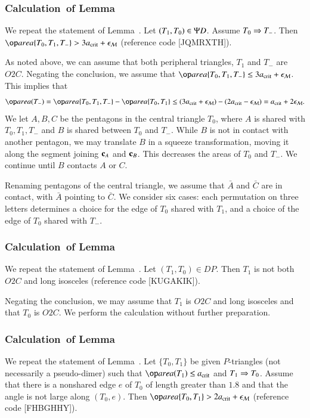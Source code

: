 \subsubsection{Calculation~of Lemma~}\label{sec:pseudo-area3}

We repeat the statement of Lemma~.  Let
$(T_1,T_0)\in\Psi D$. Assume $T_0\Rightarrow T_-$.  Then $\area\{T_0,T_1,T_-\} >
3\acrit + \epsM$ (reference code [JQMRXTH]).

As noted above, we can assume that both peripheral triangles, $T_1$
and $T_-$ are $O2C$.  Negating the conclusion, we assume that
$\area\{T_0,T_1,T_-\}\le 3\acrit+\epsM$.  This implies that
\[
\area(T_-) = \area\{T_0,T_1,T_-\} - \area\{T_0,T_1\} 
\le (3\acrit+\epsM) - (2\acrit - \epsM) = \acrit + 2\epsM.
\]
We let $A,B,C$ be the pentagons in the central triangle $T_0$, where
$A$ is shared with $T_0,T_1,T_-$ and $B$ is shared between $T_0$ and
$T_-$.  While $B$ is not in contact with another pentagon, we may
translate $B$ in a squeeze transformation, moving it along the segment
joining ${\mathbf c}_A$ and ${\mathbf c}_B$.  This decreases the areas of $T_0$ and
$T_-$.  We continue until $B$ contacts $A$ or $C$.

Renaming pentagons of the central triangle, we assume that $\bar A$
and $\bar C$ are in contact, with $\bar A$ pointing to $\bar C$.  We
consider six cases: each permutation on three letters determines a
choice for the edge of $T_0$ shared with $T_1$, and a choice of the
edge of $T_0$ shared with $T_-$.

\subsubsection{Calculation~of Lemma~}\label{sec:dimer-isosc}

We repeat the statement of Lemma~.  Let
$(T_1,T_0)\in DP$.  Then $T_1$ is not both $O2C$ and long isosceles
(reference code [KUGAKIK]).

Negating the conclusion, we may assume that $T_1$ is $O2C$ and long
isosceles and that $T_0$ is $O2C$.  We perform the calculation without
further preparation.

\subsubsection{Calculation~of Lemma~}\label{sec:large} %

We repeat the statement of Lemma~.  Let $\{T_0,T_1\}$
be given $P$-triangles (not necessarily a pseudo-dimer) such that
$\area(T_1)\le \acrit$ and $T_1\Rightarrow T_0$.  Assume that there is a
nonshared edge $e$ of $T_0$ of length greater than $1.8$ and that the
angle is not large along $(T_0,e)$.  Then $\area\{T_0,T_1\} > 2\acrit
+ \epsM$ (reference code [FHBGHHY]).


